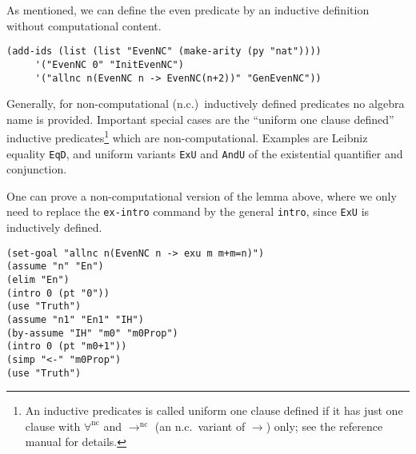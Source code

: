 \documentclass[12pt]{amsart}
\newcommand{\allnc}{\forall^{\mathrm{nc}}} %
\newcommand{\tonc}{\to^{\mathrm{nc}}}
\newcommand{\inquotes}[1]{``#1''}
\begin{document}
As mentioned, we can define the even predicate by an inductive
definition without computational content.
\begin{verbatim}
(add-ids (list (list "EvenNC" (make-arity (py "nat"))))
	 '("EvenNC 0" "InitEvenNC")
	 '("allnc n(EvenNC n -> EvenNC(n+2))" "GenEvenNC"))
\end{verbatim}
Generally, for non-computational (n.c.)\ inductively defined
predicates no algebra name is provided.  Important special cases are
the \inquotes{uniform one clause defined}%
 inductive predicates\footnote{ An
  inductive predicates is called uniform one clause defined if it has
  just one clause with $\allnc$ and $\tonc$ (an n.c.\ variant of
  $\to$) only; see the reference manual for details.}
which are non-computational.  Examples are Leibniz equality%
 \texttt{EqD}, and uniform variants
\texttt{ExU} and \texttt{AndU} of the
existential quantifier and conjunction.

One can prove a non-computational version of the lemma above, where
we only need to replace the \texttt{ex-intro} command by the general
\texttt{intro}, since \texttt{ExU} is inductively defined.
\begin{verbatim}
(set-goal "allnc n(EvenNC n -> exu m m+m=n)")
(assume "n" "En")
(elim "En")
(intro 0 (pt "0"))
(use "Truth")
(assume "n1" "En1" "IH")
(by-assume "IH" "m0" "m0Prop")
(intro 0 (pt "m0+1"))
(simp "<-" "m0Prop")
(use "Truth")
\end{verbatim}
\end{document}
